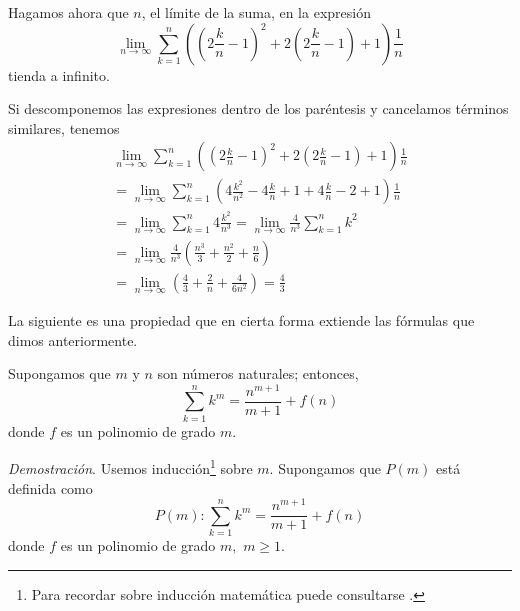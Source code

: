 \begin{ejemplo}
\textnormal {Hagamos ahora que $n$, el límite de la suma, en la expresión
{\small
\[
\underset{n\rightarrow \infty }{\lim }\sum_{k=1}^{n}\left( \left(
2\frac{k}{n}-1\right) ^{2}+2\left( 2\frac{k}{n}-1\right) +1\right) \frac{1}{n}
\]
}
tienda a infinito.}
\end{ejemplo}
Si descomponemos las expresiones dentro de los paréntesis y cancelamos términos similares, tenemos
{\footnotesize
\begin{align*}
\underset{n\rightarrow \infty }{\lim }\sum_{k=1}^{n}\left( \left( 2\frac{k}{n}-1\right) ^{2}+2\left( 2\frac{k}{n}-1\right) +1\right) \frac{1}{n} \\
= \underset{n\rightarrow \infty }{\lim }\sum_{k=1}^{n}\left( 4\frac{k^{2}}{n^{2}}-4\frac{k}{n}+1+4\frac{k}{n}-2+1\right) \frac{1}{n}\\
= \underset{n\rightarrow \infty }{\lim }\sum_{k=1}^{n}4\frac{k^{2}}{n^{3}} = \underset{n\rightarrow \infty }{\lim }\frac{4}{n^{3}}\sum_{k=1}^{n}k^{2}\\
= \underset{n\rightarrow \infty }{\lim }\frac{4}{n^{3}}\left( \frac{n^{3}}{3}+\frac{n^{2}}{2}+\frac{n}{6}\right)\\
= \underset{n\rightarrow \infty}{\lim}\left(\frac{4}{3}+\frac{2}{n}+\frac{4}{6n^{2}}\right)=\frac{4}{3}
\end{align*}
}

La siguiente es una propiedad que en cierta forma extiende las fórmulas que dimos anteriormente.

\begin{teorema}\label{SumPotenDeK}
\textnormal {Supongamos que \textit{$m$} y \textit{$n$} son números naturales; entonces,
{\small
\[
\sum_{k=1}^{n}k^{m}=\frac{n^{m+1}}{m+1}+f\left( n\right)
\]
}
donde \textit{$f$} es un polinomio de grado \textit{$m$}}.
\end{teorema}

\textit{Demostración}. Usemos inducción\footnote{Para recordar sobre inducción matemática puede consultarse \textcite{Stewart_2012}.} sobre $m.$
Supongamos que $P\left( m\right)$ está definida como
{\small
\[
P\left( m\right):\sum_{k=1}^{n}k^{m}=\frac{n^{m+1}}{m+1}+f\left( n\right)
\]
}
donde $f$ es un polinomio de grado $m,$ $m\geq 1$.

